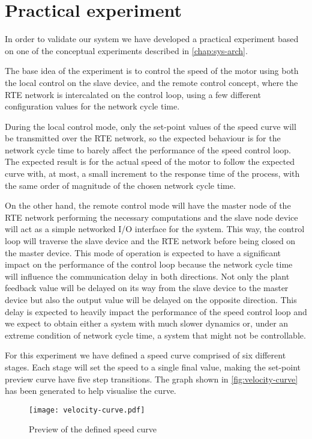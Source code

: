 \section{Practical experiment}
In order to validate our system we have developed a practical experiment based on one of the conceptual experiments described in \autoref{chap:sys-arch}.

The base idea of the experiment is to control the speed of the motor using both the local control on the slave device, and the remote control concept, where the RTE network is intercalated on the control loop, using a few different configuration values for the network cycle time.

During the local control mode, only the set-point values of the speed curve will be transmitted over the RTE network, so the expected behaviour is for the network cycle time to barely affect the performance of the speed control loop.
The expected result is for the actual speed of the motor to follow the expected curve with, at most, a small increment to the response time of the process, with the same order of magnitude of the chosen network cycle time.

On the other hand, the remote control mode will have the master node of the RTE network performing the necessary computations and the slave node device will act as a simple networked I/O interface for the system.
This way, the control loop will traverse the slave device and the RTE network before being closed on the master device.
This mode of operation is expected to have a significant impact on the performance of the control loop because the network cycle time will influence the communication delay in both directions.
Not only the plant feedback value will be delayed on its way from the slave device to the master device but also the output value will be delayed on the opposite direction.
This delay is expected to heavily impact the performance of the speed control loop and we expect to obtain either a system with much slower dynamics or, under an extreme condition of network cycle time, a system that might not be controllable.

For this experiment we have defined a speed curve comprised of six different stages.
Each stage will set the speed to a single final value, making the set-point preview curve have five step transitions.
The graph shown in \autoref{fig:velocity-curve} has been generated to help visualise the curve.

\begin{figure}[htp]
	\centering
	\texttt{[image: velocity-curve.pdf]}
	\caption{Preview of the defined speed curve}
	\label{fig:velocity-curve}
\end{figure}

